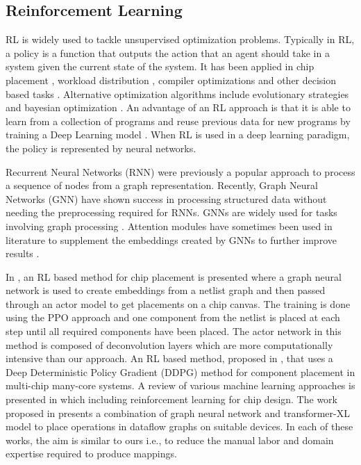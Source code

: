 \subsection{Reinforcement Learning}
RL is widely used to tackle unsupervised optimization problems.
Typically in RL, a policy is a function that outputs the action that an agent should take in a system given the current state of the system.
It has been applied in chip placement \cite{mirhoseini2020chip}, workload distribution \cite{Mirhoseini_placementRNN, addanki2019placeto, zhou2019gdp}, compiler optimizations \cite{Zhou_compileGNN} and other decision based tasks \cite{kormushev2013reinforcement, ZophL16_NASRL}. 
Alternative optimization algorithms include evolutionary strategies \cite{Zhichao_ESNAS} and bayesian optimization \cite{shi2020learned}. 
An advantage of an RL approach is that it is able to learn from a collection of programs and reuse previous data for new programs by training a Deep Learning model \cite{zhou2019gdp}.
When RL is used in a deep learning paradigm, the policy is represented by neural networks.

Recurrent Neural Networks (RNN) \cite{hochreiter1996lstm} were previously a popular approach to process a sequence of nodes from a graph representation. 
Recently, Graph Neural Networks (GNN) \cite{gori2005new} have shown success in processing structured data without needing the preprocessing required for RNNs.
GNNs are widely used for tasks involving graph processing \cite{Zhou_compileGNN, zhou2019gdp}. 
Attention modules have sometimes been used in literature to supplement the embeddings created by GNNs to further improve results \cite{addanki2019placeto}.

In \cite{mirhoseini2020chip}, an RL based method for chip placement is presented where a graph neural network is used to create embeddings from a netlist graph and then passed through an actor model to get placements on a chip canvas.
The training is done using the PPO approach and one component from the netlist is placed at each step until all required components have been placed.
The actor network in this method is composed of deconvolution layers which are more computationally intensive than our approach. 
An RL based method, proposed in \cite{wu_core_2020}, that uses a Deep Deterministic Policy Gradient (DDPG) method for component placement in multi-chip many-core systems.
A review of various machine learning approaches is presented in \cite{khailany_accelerating_2020} which including reinforcement learning for chip design.
The work proposed in \cite{zhou2019gdp} presents a combination of graph neural network and transformer-XL model to place operations in dataflow graphs on suitable devices.
In each of these works, the aim is similar to ours i.e., to reduce the manual labor and domain expertise required to produce mappings.

